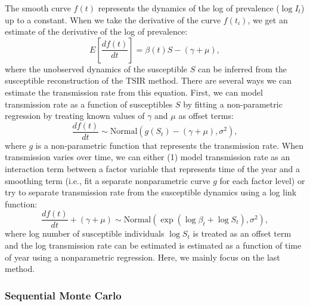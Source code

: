 \documentclass{article}
\begin{document}
The smooth curve $f(t)$ represents the dynamics of the log of prevalence ($\log I_t$) up to a constant.
When we take the derivative of the curve $f(t_i)$, we get an estimate of the derivative of the log of prevalence:
\begin{equation}
E\left[\frac{df(t)}{dt}\right] = \beta(t) S - (\gamma + \mu),
\end{equation}
where the unobserved dynamics of the susceptible $S$ can be inferred from the susceptible reconstruction of the TSIR method.
There are several ways we can estimate the transmission rate from this equation.
First, we can model transmission rate as a function of susceptibles $S$ by fitting a non-parametric regression by treating known values of $\gamma$ and $\mu$ as offset terms:
\begin{equation}
\frac{df(t)}{dt} \sim \mathrm{Normal}(g(S_t) - (\gamma + \mu), \sigma^2),
\end{equation}
where $g$ is a non-parametric function that represents the transmission rate.
When transmission varies over time, we can either (1) model transmission rate as an interaction term between a factor variable that represents time of the year and a smoothing term (i.e., fit a separate nonparametric curve $g$ for each factor level) or try to separate transmission rate from the susceptible dynamics using a log link function:
\begin{equation}
\frac{d f(t)}{dt} + (\gamma + \mu) \sim \mathrm{Normal}\left(\exp \left(\log \beta_t + \log S_t\right), \sigma^2\right),
\end{equation}
where log number of susceptible individuals $\log S_t$ is treated as an offset term and the log transmission rate can be estimated is estimated as a function of time of year using a nonparametric regression.
Here, we mainly focus on the last method.

\subsubsection*{Sequential Monte Carlo}
\end{document}
